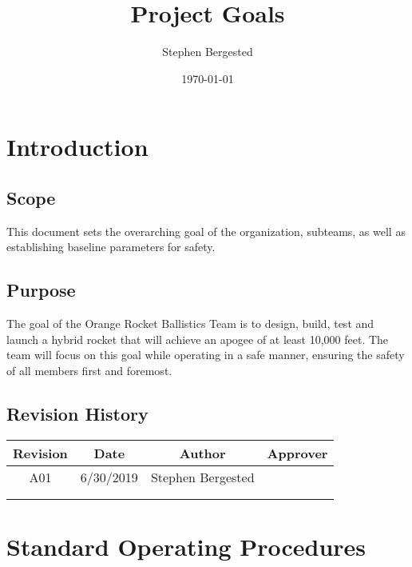 \documentclass[12pt,article]{memoir}
\title{Project Goals}
\author{Stephen Bergested}
\date{\today}
\begin{document}
	


\tableofcontents*
\clearpage


\chapter{Introduction}
\section{Scope}
This document sets the overarching goal of the organization, subteams, as well as establishing baseline parameters for safety.

\section{Purpose}
The goal of the Orange Rocket Ballistics Team is to design, build, test and launch a hybrid rocket that will achieve an apogee of at least 10,000 feet. The team will focus on this goal while operating in a safe manner, ensuring the safety of all members first and foremost.

\section{Revision History}

\begin{table}[h]
	\centering
	\begin{tabular}{c|c|c|c}
		Revision & Date & Author & Approver \\ \hline
		A01 & 6/30/2019 & Stephen Bergested &  \\
		&  &  &  \\
		&  &  & 
	\end{tabular}
\end{table}

\newpage

\chapter{Standard Operating Procedures}
\end{document}
